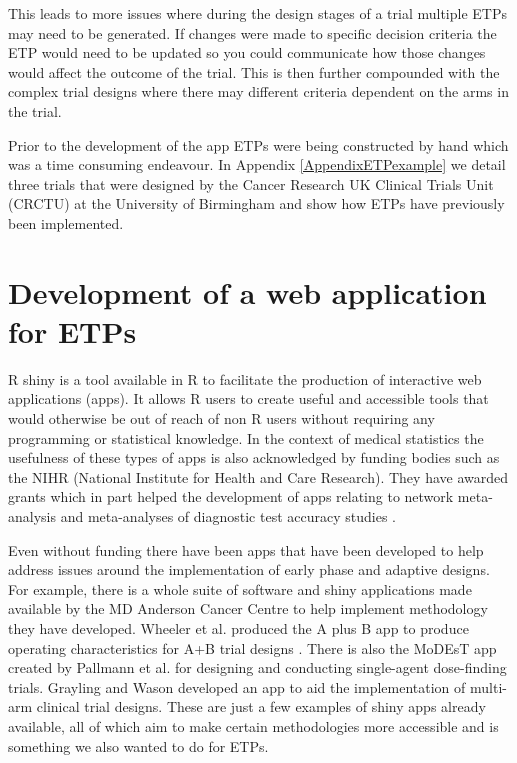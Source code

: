This leads to more issues where during the design stages of a trial multiple ETPs may need to be generated. If changes were made to specific decision criteria the ETP would need to be updated so you could communicate how those changes would affect the outcome of the trial. This is then further compounded with the complex trial designs where there may different criteria dependent on the arms in the trial.

Prior to the development of the app ETPs were being constructed by hand which was a time consuming endeavour. In Appendix \ref{AppendixETPexample} we detail three trials that were designed by the Cancer Research UK Clinical Trials Unit (CRCTU) at the University of Birmingham and show how ETPs have previously been implemented. 


\section{Development of a web application for ETPs}

R shiny \cite{changShinyWebApplication}  is a tool available in R to facilitate the production of interactive web applications (apps). It allows R users to create useful and accessible tools that would otherwise be out of reach of non R users without requiring any programming or statistical knowledge. In the context of medical statistics the usefulness of these types of apps is also acknowledged by funding bodies such as the NIHR (National Institute for Health and Care Research). They have awarded grants which in part helped the development of apps relating to network meta-analysis \cite{owenMetaInsightInteractiveWebbased2019} and meta-analyses of diagnostic test accuracy studies \cite{freemanDevelopmentInteractiveWebbased2019, patelGraphicalEnhancementsSummary2021}. 

Even without funding there have been apps that have been developed to help address issues around the implementation of early phase and adaptive designs. For example, there is a whole suite of software and shiny applications made available by the MD Anderson Cancer Centre \cite{tidwellBayesianClinicalTrials2019} to help implement methodology they have developed. Wheeler et al. \cite{wheelerAplusBWebApplication2016} produced the A plus B app to produce operating characteristics for A+B trial designs \cite{linStatisticalPropertiesTraditional2001}. There is also the MoDEsT app created by Pallmann et al. \cite{pallmannDesigningEvaluatingDoseescalation2020} for designing and conducting single-agent dose-finding trials. Grayling and Wason \cite{graylingWebApplicationDesign2020} developed an app to aid the implementation of multi-arm clinical trial designs. These are just a few examples of shiny apps already available, all of which aim to make certain methodologies more accessible and is something we also wanted to do for ETPs. 

